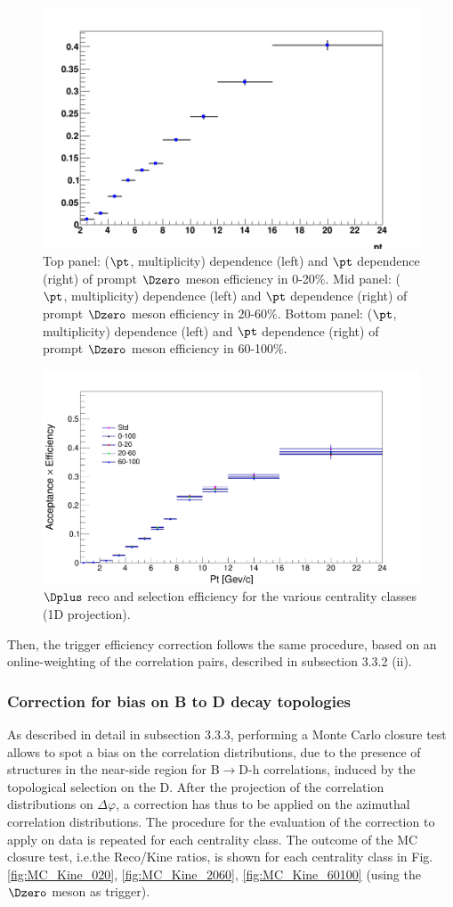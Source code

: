 \begin{figure}[h]
\includegraphics[width=.48\linewidth]{figuresVsCent/Dzero/EffAndFeed/EfficiencyMap_1D_Dzero_c_RefPtBins_Cuts020_MultWeig_wLimAcc_Plot.png}
	\caption{Top panel: ($\pt$, multiplicity) dependence (left) and $\pt$ dependence (right) of prompt $\Dzero$ meson efficiency in 0-20$\%$.
Mid panel: ($\pt$, multiplicity) dependence (left) and $\pt$ dependence (right) of prompt $\Dzero$ meson efficiency in 20-60$\%$.
Bottom panel: ($\pt$, multiplicity) dependence (left) and $\pt$ dependence (right) of prompt $\Dzero$ meson efficiency in 60-100$\%$.}
	\label{fig:dzeroEff}	
\end{figure}

\begin{figure}[h]   %
	\centering
	\includegraphics[width=.9\linewidth]{Centrality_DPlus/Dplus/Eff_cmp/eff_c_d_cmpwithjune17.png}
	\caption{$\Dplus$ reco and selection efficiency for the various centrality classes (1D projection).}
	\label{fig:dplusEff}	
\end{figure}

Then, the trigger efficiency correction follows the same procedure, based on an online-weighting of the correlation pairs, described in subsection 3.3.2 (ii).

\subsubsection{Correction for bias on B to D decay topologies}
As described in detail in subsection 3.3.3, performing a Monte Carlo closure test allows to spot a bias on the correlation distributions, due to the presence of structures in the near-side region for B$\rightarrow$D-h correlations, induced by the topological selection on the D.
After the projection of the correlation distributions on $\Delta\varphi$, a correction has thus to be applied on the azimuthal correlation distributions. The procedure for the evaluation of the correction to apply on data is repeated for each centrality class.
The outcome of the MC closure test, i.e.the Reco/Kine ratios, is shown for each centrality class in Fig. \ref{fig:MC_Kine_020}, \ref{fig:MC_Kine_2060}, \ref{fig:MC_Kine_60100} (using the $\Dzero$ meson as trigger).

